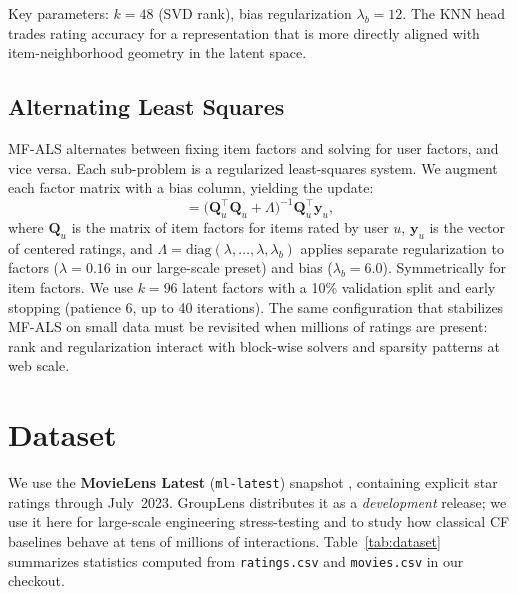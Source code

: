 \documentclass[11pt]{article}
\begin{document}
Key parameters: $k{=}48$ (SVD rank), bias regularization $\lambda_b{=}12$.
The KNN head trades rating accuracy for a representation that is more directly aligned with item-neighborhood geometry in the latent space.

\subsection{Alternating Least Squares}

MF-ALS alternates between fixing item factors and solving for user factors, and vice versa.
Each sub-problem is a regularized least-squares system.
We augment each factor matrix with a bias column, yielding the update:
\begin{equation}
[\mathbf{p}_u; b_u] = \bigl(\mathbf{Q}_u^\top \mathbf{Q}_u + \Lambda\bigr)^{-1}\mathbf{Q}_u^\top \mathbf{y}_u,
\end{equation}
where $\mathbf{Q}_u$ is the matrix of item factors for items rated by user $u$, $\mathbf{y}_u$ is the vector of centered ratings, and $\Lambda = \text{diag}(\lambda,\ldots,\lambda,\lambda_b)$ applies separate regularization to factors ($\lambda{=}0.16$ in our large-scale preset) and bias ($\lambda_b{=}6.0$).
Symmetrically for item factors.
We use $k{=}96$ latent factors with a 10\% validation split and early stopping (patience 6, up to 40 iterations).
The same configuration that stabilizes MF-ALS on small data must be revisited when millions of ratings are present: rank and regularization interact with block-wise solvers and sparsity patterns at web scale.


\section{Dataset}

We use the \textbf{MovieLens Latest} (\texttt{ml-latest}) snapshot \cite{harper2015movielens}, containing explicit star ratings through July~2023.
GroupLens distributes it as a \emph{development} release; we use it here for large-scale engineering stress-testing and to study how classical CF baselines behave at tens of millions of interactions.
Table~\ref{tab:dataset} summarizes statistics computed from \texttt{ratings.csv} and \texttt{movies.csv} in our checkout.
\end{document}
